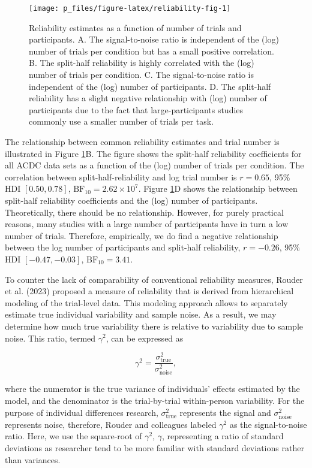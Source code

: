 \documentclass[
  man,floatsintext]{apa6}
\begin{document}
\begin{figure}

{\centering \texttt{[image: p\_files/figure-latex/reliability-fig-1]} 

}

\caption{Reliability estimates as a function of number of trials and participants. A. The signal-to-noise ratio is independent of the (log) number of trials per condition but has a small positive correlation. B. The split-half reliability is highly correlated with the (log) number of trials per condition. C. The signal-to-noise ratio is independent of the (log) number of participants. D. The split-half reliability has a slight negative relationship with (log) number of participants due to the fact that large-participants studies commonly use a smaller number of trials per task.}\label{fig:reliability-fig}
\end{figure}

The relationship between common reliability estimates and trial number is illustrated in Figure \ref{fig:reliability-fig}B. The figure shows the split-half reliability coefficients for all ACDC data sets as a function of the (log) number of trials per condition. The correlation between split-half-reliability and log trial number is \(r = 0.65\), 95\% HDI \([0.50, 0.78]\), \(\mathrm{BF}_{\textrm{10}} = 2.62 \times 10^{7}\). Figure \ref{fig:reliability-fig}D shows the relationship between split-half reliability coefficients and the (log) number of participants. Theoretically, there should be no relationship. However, for purely practical reasons, many studies with a large number of participants have in turn a low number of trials. Therefore, empirically, we do find a negative relationship between the log number of participants and split-half reliability, \(r = -0.26\), 95\% HDI \([-0.47, -0.03]\), \(\mathrm{BF}_{\textrm{10}} = 3.41\).

To counter the lack of comparability of conventional reliability measures, Rouder et al. (2023) proposed a measure of reliability that is derived from hierarchical modeling of the trial-level data. This modeling approach allows to separately estimate true individual variability and sample noise. As a result, we may determine how much true variability there is relative to variability due to sample noise. This ratio, termed \(\gamma^2\), can be expressed as

\[\gamma^2 = \frac{\sigma^2_{\text{true}}}{\sigma^2_{\text{noise}}},\]

where the numerator is the true variance of individuals' effects estimated by the model, and the denominator is the trial-by-trial within-person variability. For the purpose of individual differences research, \(\sigma^2_{\text{true}}\) represents the signal and \(\sigma^2_{\text{noise}}\) represents noise, therefore, Rouder and colleagues labeled \(\gamma^2\) as the signal-to-noise ratio. Here, we use the square-root of \(\gamma^2\), \(\gamma\), representing a ratio of standard deviations as researcher tend to be more familiar with standard deviations rather than variances.
\end{document}
